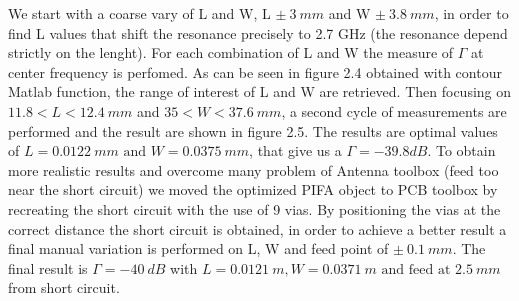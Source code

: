\documentclass[11pt]{report}
\begin{document}
We start with a coarse vary of L and W, L $\pm ~3 ~mm$ and W $\pm ~3.8 ~mm$, in order to find L values that shift the resonance precisely to 2.7 GHz (the resonance depend strictly on the lenght). For each combination of L and W the measure of $\Gamma$ at center frequency is perfomed. As can be seen in figure 2.4 obtained with contour Matlab function, the range of interest of L and W are retrieved. Then focusing on $11.8<L<12.4 ~mm$ and $ 35<W<37.6 ~mm$, a second cycle of measurements are performed and the result are shown in figure 2.5. The results are optimal values of $L = 0.0122 ~mm \text{ and } W = 0.0375 ~mm$, that give us a $\Gamma = -39.8dB$. To obtain more realistic results and overcome many problem of Antenna toolbox (feed too near the short circuit) we moved the optimized PIFA object to PCB toolbox by recreating the short circuit with the use of 9 vias. 
By positioning the vias at the correct distance the short circuit is obtained, in order to achieve a better result a final manual variation is performed on L, W and feed point of $\pm ~0.1 ~mm$. The final result is $\Gamma = -40~dB $ with $L = 0.0121 ~m, W  = 0.0371 ~m \text{ and feed at } 2.5 ~mm$ from short circuit.
\end{document}
